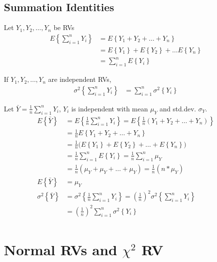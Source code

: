 \documentclass[10pt]{article}
\newcommand{\mean}[1]{\mu_{#1}}
\renewcommand{\exp}[1]{E\left\{#1\right\}} %
\newcommand{\var}[1]{\sigma^2\left\{#1\right\}}
\newcommand{\sigdev}[1]{\sigma_{#1}}
\begin{document}
\begin{multicols}{3}
    \subsection{Summation Identities}

    Let $Y_1, Y_2, \dots, Y_n$ be RVs
    \begin{align*}
        \exp{\sum^n_{i=1} Y_i} & = \exp{Y_1 + Y_2 + \dots + Y_n}           \\
                               & = \exp{Y_1} + \exp{Y_2} + \dots \exp{Y_n} \\
                               & = \sum^n_{i=1} \exp{Y_i}
    \end{align*}

    If $Y_1, Y_2, \dots, Y_n$ are independent RVs,
    \begin{align*}
        \var{\sum^n_{i=1} Y_i} & = \sum^n_{i=1} \var{Y_i}
    \end{align*}

    Let $\bar Y = \frac{1}{n} \sum^n_{i=1} Y_i$, $Y_i$ is independent with mean $\mean{Y}$ and std.dev. $\sigdev{Y}$.
    \begin{align*}
        \exp{\bar Y} & = \exp{\frac{1}{n} \sum^n_{i=1} Y_i} = \exp{\frac{1}{n} (Y_1 + Y_2 + \dots + Y_n)}       \\
                     & = \frac{1}{n} \exp{Y_1 + Y_2 + \dots + Y_n}                                              \\
                     & = \frac{1}{n} \Big(\exp{Y_1} + \exp{Y_2} + \dots + \exp{Y_n}\Big)                        \\
                     & = \frac{1}{n} \sum^n_{i=1} \exp{Y_i} = \frac{1}{n} \sum^n_{i=1} \mean{Y}                 \\
                     & = \frac{1}{n} (\mean{Y} + \mean{Y} + \dots + \mean{Y}) = \frac{1}{n} (n*\mean{Y})        \\
        \exp{\bar Y} & = \mean{Y}                                                                               \\
        \var{\bar Y} & = \var{\frac{1}{n} \sum^n_{i=1} Y_i} = \left(\frac{1}{n}\right)^2 \var{\sum^n_{i=1} Y_i} \\
                     & = \left(\frac{1}{n}\right)^2 \sum^n_{i=1} \var{Y_i}                                      \\
    \end{align*}

    \section{Normal RVs and \texorpdfstring{$\chi^2$}{X2} RV} %


\end{multicols}
\end{document}
